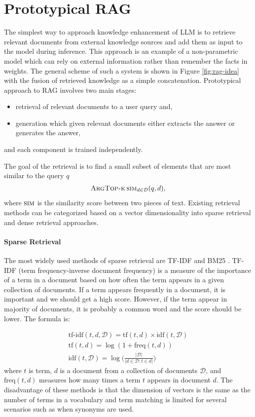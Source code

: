 \section{Prototypical RAG}
The simplest way to approach knowledge enhancement of LLM is to retrieve relevant documents from external knowledge sources and add them as input to the model during inference. This approach is an example of a non-parametric model which can rely on external information rather than remember the facts in weights. The general scheme of such a system is shown in Figure \ref{fig:rag-idea} with the fusion of retrieved knowledge as a simple concatenation.
Prototypical approach to RAG involves two main stages: 
\begin{itemize}[noitemsep]
    \item retrieval of relevant documents to a user query and,
    \item generation which given relevant documents either extracts the answer or generates the answer, 
\end{itemize}
and each component is trained independently.

The goal of the retrieval is to find a small subset of elements that are most similar to the query $q$ 
\begin{align}
    \textsc{ArgTop-k}\, \textsc{sim}_{d \in \mathcal{D}}(q,d), 
\end{align}
where $\textsc{sim}$ is the similarity score between two pieces of text.
Existing retrieval methods can be categorized based on a vector dimensionality into sparse retrieval and dense retrieval approaches.

\paragraph{Sparse Retrieval} The most widely used methods of sparse retrieval are TF-IDF \citep{robertson1997relevance} and BM25 \citep{robertson2009probabilistic}.
TF-IDF (term frequency-inverse document frequency) is a measure of the importance of a term in a document based on how often the term appears in a given collection of documents. If a term appears frequently in a document, it is important and we should get a high score. However, if the term appear in majority of documents, it is probably a common word and the score should be lower. The formula is:

\begin{align} 
\text{tf-idf}(t, d, \mathcal{D}) = \text{tf}(t, d) \times \text{idf}(t, \mathcal{D}) \\ \text{tf}(t, d) = \log(1 + \text{freq}(t, d)) \\ \text{idf}(t, \mathcal{D}) = \log \Big( \frac{\vert\mathcal{D}\vert}{\vert d \in \mathcal{D}: t\in d\vert} \Big) 
\end{align}
where $t$ is term, $d$ is a document from a collection of documents $\mathcal{D}$, and $\text{freq}(t, d)$ measures how many times a term $t$ appears in document $d$. 
The disadvantage of these methods is that the dimension of vectors is the same as the number of terms in a vocabulary and term matching is limited for several scenarios such as when synonyms are used. 

